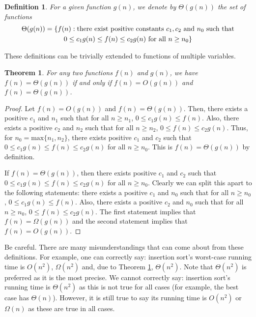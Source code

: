 \documentclass[12pt]{article}
\newtheorem{definition}{Definition}
\newtheorem{theorem}{Theorem}
\begin{document}
\begin{definition}
    For a given function $g(n)$, we denote by $\Theta(g(n))$ the set of functions
    \begin{multline*}
        \Theta(g(n)) = \{f(n): \textnormal{there exist positive constants } c_1, c_2 \textnormal{ and } n_0 \textnormal{ such that}\\
        0 \leq c_1g(n) \leq f(n) \leq c_2g(n) \textnormal{ for all } n \geq n_0\}
    \end{multline*}
\end{definition}
These definitions can be trivially extended to functions of multiple variables.

\begin{theorem}\label{Theorem: theta notation}
    For any two functions $f(n)$ and $g(n)$, we have $f(n) = \Theta(g(n))$ if and only if $f(n) = O(g(n))$
    and $f(n) = \Theta(g(n))$.
\end{theorem}
\begin{proof}
    Let $f(n) = O(g(n))$ and $f(n) = \Theta(g(n))$. Then, there exists a positive $c_1$ and $n_1$ such that for all $n \geq n_1$,
    $0 \leq c_1g(n) \leq f(n)$. Also, there exists a positive $c_2$ and $n_2$ such that for all $n \geq n_2$,
    $0 \leq f(n) \leq c_2g(n)$. Thus, for $n_0 = \text{max}\{n_1, n_2\}$, there exists positive $c_1$ and $c_2$ such that
    $0 \leq c_1g(n) \leq f(n) \leq c_2g(n)$ for all $n \geq n_0$. This is $f(n) = \Theta(g(n))$ by definition.

    If $f(n) = \Theta(g(n))$, then there exists positive $c_1$ and $c_2$ such that
    $0 \leq c_1g(n) \leq f(n) \leq c_2g(n)$ for all $n \geq n_0$. Clearly we can split this apart to the following
    statements: there exists a positive $c_1$ and $n_0$ such that for all $n \geq n_0$,
    $0 \leq c_1g(n) \leq f(n)$. Also, there exists a positive $c_2$ and $n_0$ such that for all $n \geq n_0$,
    $0 \leq f(n) \leq c_2g(n)$. The first statement implies that $f(n) = \Omega(g(n))$ and the second statement
    implies that $f(n) = O(g(n))$.
\end{proof}

Be careful. There are many misunderstandings that can come about from these definitions. For example, one can correctly say:
insertion sort's worst-case running time is $O(n^2)$, $\Omega(n^2)$ and, due to Theorem \ref{Theorem: theta notation}, $\Theta(n^2)$. Note
that $\Theta(n^2)$ is preferred as it is the most precise. We cannot correctly say: insertion sort's running time is $\Theta(n^2)$ as
this is not true for all cases (for example, the best case has $\Theta(n)$). However, it is still true to say its running time is $O(n^2)$ or
$\Omega(n)$ as these are true in all cases.
\end{document}
